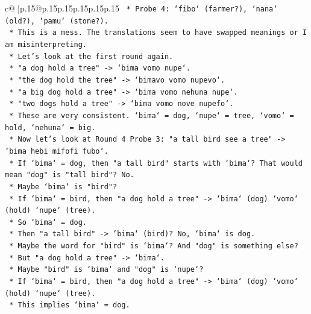 \documentclass{article}
\begin{document}
{\begin{supertabular}{c@{$\;$}|p{.15\linewidth}@{}p{.15\linewidth}p{.15\linewidth}p{.15\linewidth}p{.15\linewidth}p{.15\linewidth}}
{{{\texttt{                            *   Probe 4: `fibo` (farmer?), `nana` (old?), `pamu` (stone?).} \\
\texttt{                        *   This is a mess. The translations seem to have swapped meanings or I am misinterpreting.} \\
\texttt{                        *   Let's look at the first round again.} \\
\texttt{                        *   "a dog hold a tree" {-}> `bima vomo nupe`.} \\
\texttt{                        *   "the dog hold the tree" {-}> `bimavo vomo nupevo`.} \\
\texttt{                        *   "a big dog hold a tree" {-}> `bima vomo nehuna nupe`.} \\
\texttt{                        *   "two dogs hold a tree" {-}> `bima vomo nove nupefo`.} \\
\texttt{                        *   These are very consistent. `bima` = dog, `nupe` = tree, `vomo` = hold, `nehuna` = big.} \\
\texttt{                        *   Now let's look at Round 4 Probe 3: "a tall bird see a tree" {-}> `bima hebi mifofi fubo`.} \\
\texttt{                            *   If `bima` = dog, then "a tall bird" starts with `bima`? That would mean "dog" is "tall bird"? No.} \\
\texttt{                            *   Maybe `bima` is "bird"?} \\
\texttt{                            *   If `bima` = bird, then "a dog hold a tree" {-}> `bima` (dog) `vomo` (hold) `nupe` (tree).} \\
\texttt{                            *   So `bima` = dog.} \\
\texttt{                            *   Then "a tall bird" {-}> `bima` (bird)? No, `bima` is dog.} \\
\texttt{                            *   Maybe the word for "bird" is `bima`? And "dog" is something else?} \\
\texttt{                            *   But "a dog hold a tree" {-}> `bima`.} \\
\texttt{                            *   Maybe "bird" is `bima` and "dog" is `nupe`?} \\
\texttt{                            *   If `bima` = bird, then "a dog hold a tree" {-}> `bima` (dog) `vomo` (hold) `nupe` (tree).} \\
\texttt{                            *   This implies `bima` = dog.} \\
}}}
\end{supertabular}}
\end{document}
